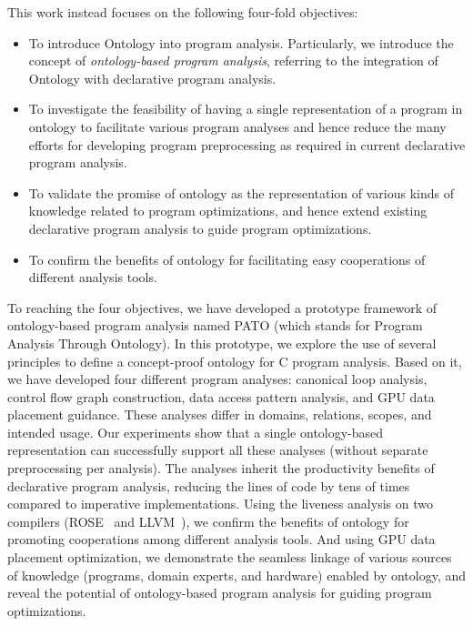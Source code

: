 This work instead focuses on the following four-fold objectives:
\begin{itemize}
\item To introduce Ontology into program analysis. Particularly, we introduce the
concept of {\em ontology-based program analysis}, referring to the
integration of Ontology with declarative program analysis.
\item To investigate the feasibility of having a single
representation of a program in ontology to facilitate various program
analyses and hence reduce the many efforts for developing program
preprocessing as required in current declarative program analysis.
\item To validate the promise of ontology as the representation
of various kinds of knowledge related to program optimizations, and
hence extend existing declarative program analysis to guide program
optimizations.
\item To confirm the benefits of ontology for facilitating
easy cooperations of different analysis tools.
\end{itemize}

To reaching the four objectives, we have developed a prototype
framework of ontology-based program analysis named PATO (which stands
for Program Analysis Through Ontology). In this prototype, we explore
the use of several principles to define a concept-proof ontology for C
program analysis. Based on it, we have developed four different
program analyses: canonical loop analysis, control flow graph
construction, data access pattern analysis, and GPU data placement
guidance. These analyses differ in domains, relations, scopes, and
intended usage. Our experiments show that a single ontology-based
representation can successfully support all these analyses (without
separate preprocessing per analysis). The analyses inherit the
productivity benefits of declarative program analysis, reducing the
lines of code by tens of times compared to imperative
implementations. Using the liveness analysis on two compilers
(ROSE~\cite{ROSE} and LLVM~\cite{Lattner2004}), 
we confirm the benefits of ontology for promoting cooperations among
different analysis tools. 
And using GPU data placement optimization,
we demonstrate the seamless linkage of various sources of knowledge
(programs, domain experts, and hardware) enabled by ontology, and
reveal the potential of ontology-based program analysis for guiding
program optimizations.

